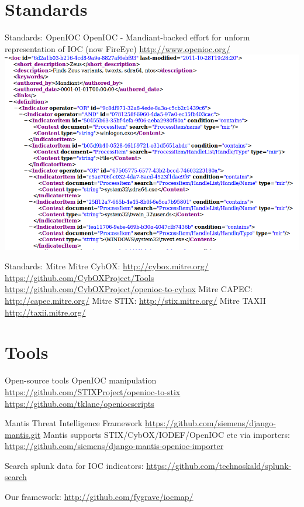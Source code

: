 \documentclass[presentation,smaller]{beamer}
\begin{document}
\section{Standards}
\label{sec-2}
\begin{frame}[label=sec-2-1]{Standards: OpenIOC}
OpenIOC - Mandiant-backed effort for unform representation of IOC
(now FireEye)
\url{http://www.openioc.org/}
\includegraphics[width=.9\linewidth]{images/zeus-ioc.png}
\end{frame}
\begin{frame}[label=sec-2-2]{Standards: Mitre}
Mitre CybOX:
\url{http://cybox.mitre.org/}
\url{https://github.com/CybOXProject/Tools}
\url{https://github.com/CybOXProject/openioc-to-cybox}
Mitre CAPEC:
\url{http://capec.mitre.org/}
Mitre STIX:
\url{http://stix.mitre.org/}
Mitre TAXII
\url{http://taxii.mitre.org/}
\end{frame}
\section{Tools}
\label{sec-3}

\begin{frame}[label=sec-3-1]{Open-source tools}
OpenIOC manipulation
\url{https://github.com/STIXProject/openioc-to-stix}
\url{https://github.com/tklane/openiocscripts} 

Mantis Threat Intelligence Framework
 \url{https://github.com/siemens/django-mantis.git}
Mantis supports STIX/CybOX/IODEF/OpenIOC etc via
importers: \url{https://github.com/siemens/django-mantis-openioc-importer}


Search splunk data for IOC indicators:
\url{https://github.com/technoskald/splunk-search}

Our framework:
\url{http://github.com/fygrave/iocmap/}
\end{frame}
\end{document}

